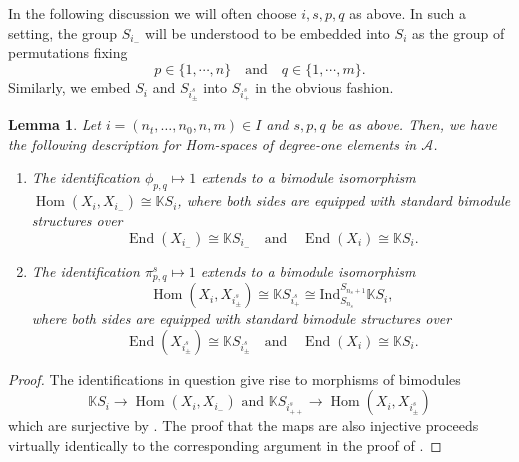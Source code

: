 \documentclass[11pt]{article}
\renewcommand{\labelenumi}{(\arabic{enumi})}
\theoremstyle{plain}
\newtheorem{lemma}{Lemma}[section]
\theoremstyle{nonumberplain}
\theoremstyle{plain}
\theoremstyle{nonumberplain}
\newtheorem{proof}{Proof}
\newcommand\bK{\mathbb K}
\newcommand\cA{\mathcal A}
\DeclareMathOperator{\End}{\mathrm{End}}
\DeclareMathOperator{\Hom}{\mathrm{Hom}}
\begin{document}
In the following discussion we will often choose $i,s,p,q$ as above. In such a setting, the group $S_{i_-}$ will be
understood to be embedded into $S_i$ as the group of permutations
fixing
\begin{equation*}
  p\in \{1,\cdots,n\} \quad\text{and} \quad q\in \{1,\cdots,m\}. 
\end{equation*}
Similarly, we embed $S_i$ and $S_{i^s_{\pm}}$ into $S_{i^s_+}$ in the
obvious fashion.


\begin{lemma}\label{le.deg-1}
  Let $i=\left(n_t,\ldots,n_0,n,m\right)\in I$ and $s,p,q$ be as above.  Then, we have the following description for Hom-spaces of degree-one elements in $\cA$.
  \begin{enumerate}
    \renewcommand{\labelenumi}{(\alph{enumi})}
  \item The identification $\phi_{p,q}\mapsto 1$ extends to a bimodule
    isomorphism $\Hom(X_i,X_{i_-})\cong \bK S_i$, where both sides are
    equipped with standard bimodule structures over
    \begin{equation*}
      \End(X_{i_-})\cong \bK S_{i_-} \quad\text{and}\quad \End(X_i)\cong \bK S_i. 
    \end{equation*}
  \item The identification $\pi^s_{p,q}\mapsto 1$ extends to a
    bimodule isomorphism
    \begin{equation*}
      \Hom(X_i,X_{i^s_{\pm}})\cong \bK S_{i^s_+}\cong \mathrm{Ind}_{S_{n_s}}^{S_{n_s+1}}\bK S_i,
    \end{equation*}
    where both sides are equipped with standard bimodule structures
    over
    \begin{equation*}
      \End(X_{i^s_{\pm}})\cong \bK S_{i^s_{\pm}} \quad\text{and}\quad \End(X_i)\cong \bK S_i. 
    \end{equation*}
  \end{enumerate}
\end{lemma}
\begin{proof}
  The identifications in question give rise to morphisms of bimodules
  \begin{equation*}
    \bK S_i\to \Hom(X_i,X_{i_-})\text{ and } \bK S_{i^s_{++}}\to \Hom(X_i,X_{i^s_{\pm}})
  \end{equation*}
  which are surjective by . The proof that the maps are also
  injective proceeds virtually identically to the corresponding
  argument in the proof of \cite[Lemma 3.24]{us}.
\end{proof}
\end{document}
